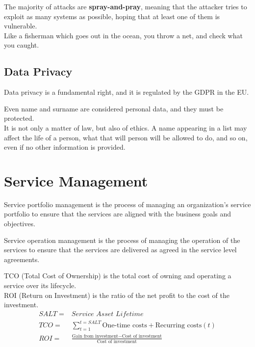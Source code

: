 The majority of attacks are \textbf{spray-and-pray}, meaning that the attacker tries to exploit as many systems as possible, hoping that at least one of them is vulnerable.\\
Like a fisherman which goes out in the ocean, you throw a net, and check what you caught.

\subsection{Data Privacy}
Data privacy is a fundamental right, and it is regulated by the GDPR in the EU.

Even name and surname are considered personal data, and they must be protected.\\
It is not only a matter of law, but also of ethics.
A name appearing in a list may affect the life of a person, what that will person will be allowed to do, and so on, even if no other information is provided.



\section{Service Management}
Service portfolio management is the process of managing an organization’s service portfolio to ensure that the services are aligned with the business goals and objectives.

Service operation management is the process of managing the operation of the services to ensure that the services are delivered as agreed in the service level agreements.

TCO (Total Cost of Ownership) is the total cost of owning and operating a service over its lifecycle.\\
ROI (Return on Investment) is the ratio of the net profit to the cost of the investment.
\begin{align}
   SALT =& \textit{Service Asset Lifetime}\\
   TCO =& \sum_{t=1}^{t = \textit{SALT}} \text{One-time costs} + \text{Recurring costs}(t)\\
   ROI =& \frac{\text{Gain from investment} - \text{Cost of investment}}{\text{Cost of investment}}
\end{align}